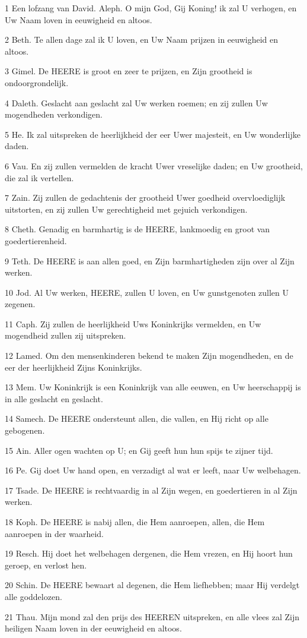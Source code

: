 \par 1 Een lofzang van David. Aleph. O mijn God, Gij Koning! ik zal U verhogen, en Uw Naam loven in eeuwigheid en altoos.
\par 2 Beth. Te allen dage zal ik U loven, en Uw Naam prijzen in eeuwigheid en altoos.
\par 3 Gimel. De HEERE is groot en zeer te prijzen, en Zijn grootheid is ondoorgrondelijk.
\par 4 Daleth. Geslacht aan geslacht zal Uw werken roemen; en zij zullen Uw mogendheden verkondigen.
\par 5 He. Ik zal uitspreken de heerlijkheid der eer Uwer majesteit, en Uw wonderlijke daden.
\par 6 Vau. En zij zullen vermelden de kracht Uwer vreselijke daden; en Uw grootheid, die zal ik vertellen.
\par 7 Zain. Zij zullen de gedachtenis der grootheid Uwer goedheid overvloediglijk uitstorten, en zij zullen Uw gerechtigheid met gejuich verkondigen.
\par 8 Cheth. Genadig en barmhartig is de HEERE, lankmoedig en groot van goedertierenheid.
\par 9 Teth. De HEERE is aan allen goed, en Zijn barmhartigheden zijn over al Zijn werken.
\par 10 Jod. Al Uw werken, HEERE, zullen U loven, en Uw gunstgenoten zullen U zegenen.
\par 11 Caph. Zij zullen de heerlijkheid Uws Koninkrijks vermelden, en Uw mogendheid zullen zij uitspreken.
\par 12 Lamed. Om den mensenkinderen bekend te maken Zijn mogendheden, en de eer der heerlijkheid Zijns Koninkrijks.
\par 13 Mem. Uw Koninkrijk is een Koninkrijk van alle eeuwen, en Uw heerschappij is in alle geslacht en geslacht.
\par 14 Samech. De HEERE ondersteunt allen, die vallen, en Hij richt op alle gebogenen.
\par 15 Ain. Aller ogen wachten op U; en Gij geeft hun hun spijs te zijner tijd.
\par 16 Pe. Gij doet Uw hand open, en verzadigt al wat er leeft, naar Uw welbehagen.
\par 17 Tsade. De HEERE is rechtvaardig in al Zijn wegen, en goedertieren in al Zijn werken.
\par 18 Koph. De HEERE is nabij allen, die Hem aanroepen, allen, die Hem aanroepen in der waarheid.
\par 19 Resch. Hij doet het welbehagen dergenen, die Hem vrezen, en Hij hoort hun geroep, en verlost hen.
\par 20 Schin. De HEERE bewaart al degenen, die Hem liefhebben; maar Hij verdelgt alle goddelozen.
\par 21 Thau. Mijn mond zal den prijs des HEEREN uitspreken, en alle vlees zal Zijn heiligen Naam loven in der eeuwigheid en altoos.

